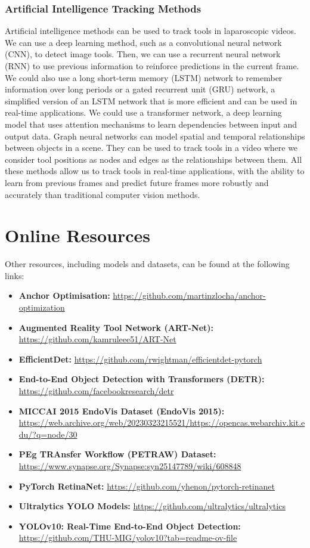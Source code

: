\subsubsection{Artificial Intelligence Tracking Methods}

Artificial intelligence methods can be used to track tools in laparoscopic videos. We can use a deep learning method, such as a convolutional neural network (CNN), to detect image tools. Then, we can use a recurrent neural network (RNN) to use previous information to reinforce predictions in the current frame. We could also use a long short-term memory (LSTM) network to remember information over long periods or a gated recurrent unit (GRU) network, a simplified version of an LSTM network that is more efficient and can be used in real-time applications. We could use a transformer network, a deep learning model that uses attention mechanisms to learn dependencies between input and output data. Graph neural networks can model spatial and temporal relationships between objects in a scene. They can be used to track tools in a video where we consider tool positions as nodes and edges as the relationships between them. All these methods allow us to track tools in real-time applications, with the ability to learn from previous frames and predict future frames more robustly and accurately than traditional computer vision methods.

\section{Online Resources}

Other resources, including models and datasets, can be found at the following links:

\begin{itemize}[noitemsep, left=0pt]
\item \textbf{Anchor Optimisation:} \url{https://github.com/martinzlocha/anchor-optimization}
\item \textbf{Augmented Reality Tool Network (ART-Net):} \url{https://github.com/kamruleee51/ART-Net}
\item \textbf{EfficientDet:} \url{https://github.com/rwightman/efficientdet-pytorch}
\item \textbf{End-to-End Object Detection with Transformers (DETR):} \url{https://github.com/facebookresearch/detr}
\item \textbf{MICCAI 2015 EndoVis Dataset (EndoVis 2015):} \url{https://web.archive.org/web/20230323215521/https://opencas.webarchiv.kit.edu/?q=node/30}
\item \textbf{PEg TRAnsfer Workflow (PETRAW) Dataset:} \url{https://www.synapse.org/Synapse:syn25147789/wiki/608848}
\item \textbf{PyTorch RetinaNet:} \url{https://github.com/yhenon/pytorch-retinanet}
\item \textbf{Ultralytics YOLO Models:} \url{https://github.com/ultralytics/ultralytics}
\item \textbf{YOLOv10: Real-Time End-to-End Object Detection:} \url{https://github.com/THU-MIG/yolov10?tab=readme-ov-file}
\end{itemize}